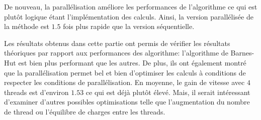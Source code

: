 De nouveau, la parallélisation améliore les performances de l'algorithme ce qui est plutôt logique étant l'implémentation des calculs. Ainsi, la version parallélisée de la méthode est $1.5$ fois plus rapide que la version séquentielle.

\vspace{2mm}


Les résultats obtenus dans cette partie ont permis de vérifier les résultats théoriques par rapport aux performances des algorithme: l'algorithme de Barnes-Hut est bien plus performant que les autres. De plus, ils ont également montré que la parallélisation permet bel et bien d'optimiser les calculs à conditions de respecter les conditions de parallélisation. En moyenne, le gain de vitesse avec $4$ threads est d'environ $1.53$ ce qui est déjà plutôt élevé. Mais, il serait intéressant d'examiner d'autres possibles optimisations telle que l'augmentation du nombre de thread ou l'équilibre de charges entre les threads.